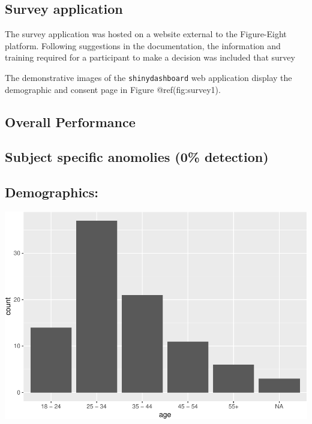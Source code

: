 \documentclass[conference,final,]{IEEEtran}
\makeatletter
\def\maxwidth{\ifdim\Gin@nat@width>\linewidth\linewidth
\else\Gin@nat@width\fi}
\let\Oldincludegraphics\includegraphics
\renewcommand{\includegraphics}[1]{\Oldincludegraphics[width=\maxwidth]{#1}}
\makeatother
\begin{document}
\hypertarget{survey-application}{%
\subsection{Survey application}\label{survey-application}}

The survey application was hosted on a website external to the
Figure-Eight platform. Following suggestions in the documentation, the
information and training required for a participant to make a decision
was included that survey

The demonstrative images of the \texttt{shinydashboard} web application
display the demographic and consent page in Figure @ref(fig:survey1).

\hypertarget{overall-performance}{%
\subsection{Overall Performance}\label{overall-performance}}

\hypertarget{subject-specific-anomolies-0-detection}{%
\subsection{Subject specific anomolies (0\%
detection)}\label{subject-specific-anomolies-0-detection}}

\hypertarget{demographics}{%
\subsection{Demographics:}\label{demographics}}

\includegraphics{paper_files/figure-latex/demogs-1.pdf}
\end{document}
